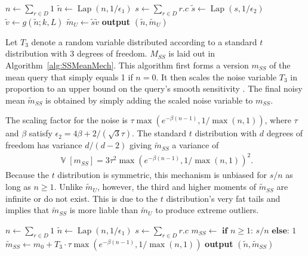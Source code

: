 \documentclass[11pt]{article}
\newcommand{\Lap}{\operatorname{Lap}}
\newcommand{\V}{\operatorname{\mathbb{V}}}
\begin{document}
\begin{algorithm}

\caption{\label{alg:OurMeanMech} $M_U$}
\begin{algorithmic}[1]

    \State $n \leftarrow \sum_{r \in D} 1$
    \State $\tilde{n} \leftarrow \Lap(n, 1/\epsilon_1)$ 
    \State $s \leftarrow \sum_{r \in D} r.c$
    \State $\tilde{s} \leftarrow \Lap(s, 1/\epsilon_2)$ 
    \State $\tilde{v} \leftarrow g(\tilde{n};k,L)$ 
    \State $\tilde{m}_U \leftarrow \tilde{s}\tilde{v}$
    \State \textbf{output} $(\tilde{n}, \tilde{m}_U)$
    \EndProcedure
\end{algorithmic}    
\end{algorithm}

Let $T_3$ denote a random variable distributed according to a standard $t$ distribution with 3 degrees of freedom. $M_{SS}$ is laid out in Algorithm~\ref{alg:SSMeanMech}. This algorithm first forms a version $m_{SS}$ of the mean query that simply equals 1 if $n = 0$. It then scales the noise variable $T_3$ in proportion to an upper bound on the query's smooth sensitivity  \cite{KamathEtAl2023Trilemma}. The final noisy mean $\tilde{m}_{SS}$ is obtained by simply adding the scaled noise variable to $m_{SS}$.

The scaling factor for the noise is $\tau \max(e^{-\beta(n-1)}, 1/\max(n,1))$, where $\tau$ and $\beta$ satisfy $\epsilon_2 = 4\beta + 2/(\sqrt{3}\tau)$. The standard $t$ distribution with $d$ degrees of freedom has variance $d/(d-2)$ giving $\tilde{m}_{SS}$ a variance of 
\begin{align}
    \V[m_{SS}] = 3 \tau^2 \max(e^{-\beta(n-1)}, 1/\max(n,1))^2.
\end{align}
Because the $t$ distribution is symmetric, this mechanism is unbiased for $s/n$ as long as $n \geq 1$. Unlike $\tilde{m}_U$, however, the third and higher moments of $\tilde{m}_{SS}$ are infinite or do not exist. This is due to the $t$ distribution's very fat tails and implies that $\tilde{m}_{SS}$ is more liable than $\tilde{m}_U$ to produce extreme outliers.


\begin{algorithm}
\caption{\label{alg:SSMeanMech} $M_{SS}$}
\begin{algorithmic}[1]
    \State $n \leftarrow \sum_{r \in D} 1$
    \State $\tilde{n} \leftarrow \Lap(n, 1/\epsilon_1)$
    \State $s \leftarrow \sum_{r \in D} r.c$
    \State $m_{SS} \leftarrow \textbf{ if $n \geq 1$: $s/n$ else: $1$}$
    \State $\tilde{m}_{SS} \leftarrow m_0 + T_3 \cdot \tau \max(e^{-\beta(n-1)}, 1/\max(n,1))$
    \State \textbf{output} $(\tilde{n}, \tilde{m}_{SS})$
    \EndProcedure
\end{algorithmic}    
\end{algorithm}
\end{document}
